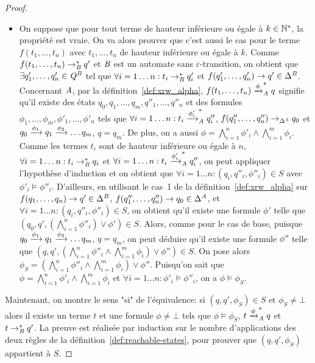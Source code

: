 \begin{proof}
\begin{itemize}
\item On suppose que pour tout terme de hauteur inférieure ou égale à $k\in\mathbb{N}^*$, la propriété
  est vraie. On va alors prouver que c'est aussi le cas pour le terme $f(t_1, \ldots,
  t_n)$ avec $t_1, \ldots, t_n$ de hauteur inférieure ou égale à $k$. Comme $f(t_1,
  \ldots, t_n) \rightarrow^*_\mathit B q'$ et $\mathit B$ est un automate sans $\varepsilon$-transition, on
  obtient que $\exists q'_1,\ldots,q'_n\in\mathit Q^\mathit B$ tel que $\forall i=1\ldots n:
  t_i \rightarrow^*_\mathit B q'_i$ et $f(q'_1,\ldots,q'_n) \rightarrow q' \in \Delta^\mathit B$. 
  Concernant $\mathit A$, par la définition~\ref{def:xrw_alpha}, $f(t_1, \ldots, t_n)
  \xrightarrow{\phi}^*_\mathit A q$ signifie qu'il existe des états $q_0,q_1, \ldots,
  q_m,q''_1,\ldots,q''_n$ et des formules $\phi_1,\ldots, \phi_m, \phi'_1, \ldots,
  \phi'_n$ tels que $\forall i=1\ldots n: t_i \xrightarrow{\phi'_i}^*_\mathit A q''_i$,
  $f(q''_1,\ldots, q''_n) \rightarrow_{\Delta^\mathit A} q_0$ et $q_0 \xrightarrow{\phi_1} q_1
  \xrightarrow{\phi_2} \ldots q_m$, $q=q_m$. De plus, on a aussi $\phi=
  \bigwedge_{i=1}^{n} \phi'_i \wedge \bigwedge_{i=1}^{m} \phi_i$. %
  Comme les termes $t_i$ sont de hauteur inférieure ou égale à $n$, $\forall
  i=1\ldots n: t_i \rightarrow^*_\mathit B q_i$ et $\forall i=1 \ldots n: t_i \xrightarrow{\phi'_i}_\mathit A^*
  q''_i$, on peut appliquer l'hypothèse d'induction  et on obtient que $\forall
  i=1\ldots n: (q_i, q''_i, \phi''_i) \in S$ avec $\phi'_i \models \phi''_i$. %
  D'ailleurs, en utilisant le cas~1 de la définition~\ref{def:xrw_alpha} sur
  $f(q_1,\ldots,q_n) \rightarrow q' \in \Delta^\mathit B$, $f(q''_1,\ldots,q''_n) \rightarrow q_0 \in
  \Delta^\mathit A$, et $\forall i=1\ldots n: (q_i, q''_i, \phi''_i) \in S$, on obtient
  qu'il existe une formule $\phi'$ telle que $(q_0,q', (\bigwedge_{i=1}^n
  \phi''_i) \vee \phi')\in S$. Alors, comme pour le cas de base, puisque $q_0
  \xrightarrow{\phi_1} q_1 \xrightarrow{\phi_2} \ldots q_m$, $q=q_m$, on peut déduire qu'il
  existe une formule $\phi''$ telle que $(q,q',(\bigwedge_{i=1}^n \phi''_i
  \wedge \bigwedge_{i=1}^{m} \phi_i) \vee \phi'')\in S$. On pose alors $\phi_S= (\bigwedge_{i=1}^n \phi''_i
  \wedge \bigwedge_{i=1}^{m} \phi_i) \vee \phi''$. Puisqu'on sait que $\phi=\bigwedge_{i=1}^n \phi'_i \wedge \bigwedge_{i=1}^{m} \phi_i$
  et $\forall i=1\ldots n: \phi'_i \models \phi''_i$, on a $\phi \models \phi_S$.   %
\end{itemize}


\medskip
Maintenant, on montre le sens "si" de l'équivalence: si $(q,q',\phi_S)\in S$ et $\phi_S \neq \bot$
alors il existe un terme $t$ et une formule $\phi \neq \bot$ tels que $\phi \models \phi_S$,
$t\xrightarrow{\phi}^*_\mathit A q$ et $t \rightarrow_\mathit B^* q'$. La preuve est réalisée par induction sur
le nombre d'applications des deux règles de la définition~\ref{def:reachable-states}, 
pour prouver que $(q,q',\phi_S)$ appartient à $S$.


\end{proof}
